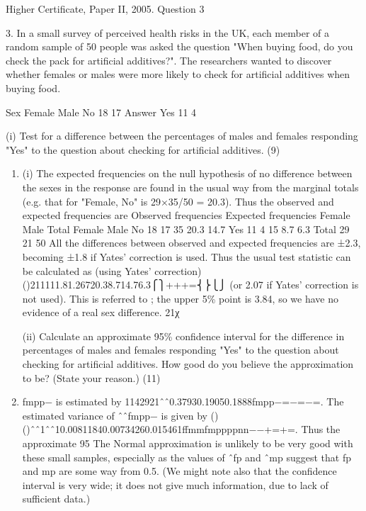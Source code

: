 \documentclass[a4paper,12pt]{article}
\begin{document}
Higher Certificate, Paper II, 2005. Question 3
\begin{framed}

3. In a small survey of perceived health risks in the UK, each member of a random sample of 50 people was asked the question "When buying food, do you check the pack for artificial additives?".  The researchers wanted to discover whether females or males were more likely to check for artificial additives when buying food. 
 
  Sex   Female Male No 18 17 Answer Yes 11   4 
 
 
(i) Test for a difference between the percentages of males and females responding "Yes" to the question about checking for artificial additives. (9) 
 


 

\end{framed}
\begin{enumerate}
\item (i) The expected frequencies on the null hypothesis of no difference between the sexes in the response are found in the usual way from the marginal totals (e.g. that for "Female, No" is 29×35/50 = 20.3). Thus the observed and expected frequencies are
Observed frequencies
Expected frequencies
Female
Male
Total
Female
Male
No
18
17
35
20.3
14.7
Yes
11
4
15
8.7
6.3
Total
29
21
50
All the differences between observed and expected frequencies are ±2.3, becoming ±1.8 if Yates' correction is used. Thus the usual test statistic can be calculated as (using Yates' correction)
()211111.81.26720.38.714.76.3⎧⎫+++=⎨⎬⎩⎭
(or 2.07 if Yates' correction is not used). This is referred to ; the upper 5\% point is 3.84, so we have no evidence of a real sex difference. 21χ

\begin{framed}
(ii) Calculate an approximate 95\% confidence interval for the difference in percentages of males and females responding "Yes" to the question about checking for artificial additives.  How good do you believe the approximation to be?  (State your reason.) (11) 
 
\end{framed}
\item  fmpp− is estimated by 1142921ˆˆ0.37930.19050.1888fmpp−=−=−=. The estimated variance of ˆˆfmpp− is given by
()()ˆˆ1ˆˆ10.00811840.00734260.015461ffmmfmppppnn−−+=+=.
Thus the approximate 95%
The Normal approximation is unlikely to be very good with these small samples, especially as the values of ˆfp and ˆmp suggest that fp and mp are some way from 0.5.
(We might note also that the confidence interval is very wide; it does not give much information, due to lack of sufficient data.)
\end{enumerate}
\end{document}
